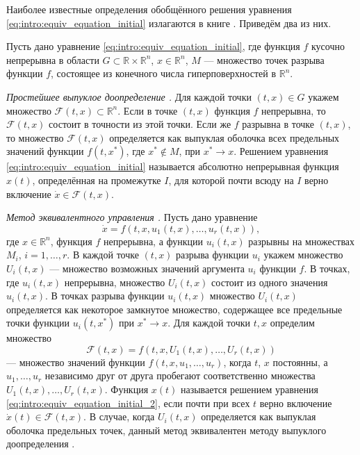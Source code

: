 Наиболее известные определения обобщённого решения уравнения \eqref{eq:intro:equiv_equation_initial} излагаются в книге \cite[\S 4]{Filippov1988}. Приведём два из них.

Пусть дано уравнение \eqref{eq:intro:equiv_equation_initial}, где функция $f$ кусочно непрерывна в области $G \subset \mathbb{R} \times \mathbb{R}^n$, $x \in \mathbb{R}^n$, $M$ --- множество точек разрыва функции $f$, состоящее из конечного числа гиперповерхностей в $\mathbb{R}^n$.

\emph{Простейшее выпуклое доопределение \cite{Filippov1988}.} Для каждой точки $(t, x) \in G$ укажем множество $\mathcal{F}(t, x) \subset \mathbb{R}^n$. Если в точке $(t, x)$ функция $f$ непрерывна, то $\mathcal{F}(t, x)$ состоит в точности из этой точки. Если же $f$ разрывна в точке $(t, x)$, то множество $\mathcal{F}(t, x)$ определяется как выпуклая оболочка всех предельных значений функции $f(t, x^*)$, где $x^* \not\in M$, при $x^* \to x$. Решением уравнения \eqref{eq:intro:equiv_equation_initial} называется абсолютно непрерывная функция $x(t)$, определённая на промежутке $I$, для которой почти всюду на $I$ верно включение $\dot{x} \in \mathcal{F}(t, x)$.

\emph{Метод эквивалентного управления \cite{Utkin1981}.} Пусть дано уравнение 
\begin{equation}
	\label{eq:intro:equiv_equation_initial_2}
	\dot{x} = f(t, x, u_1(t, x), \ldots, u_r(t, x)),
\end{equation}
где $x \in \mathbb{R}^n$, функция $f$ непрерывна, а функции $u_i(t, x)$ разрывны на множествах $M_i$, $i = 1, \ldots, r$. В каждой точке $(t, x)$ разрыва функции $u_i$ укажем множество $U_i(t, x)$ --- множество возможных значений аргумента $u_i$ функции $f$. В точках, где $u_i(t, x)$ непрерывна, множество $U_i(t, x)$ состоит из одного значения $u_i(t, x)$. В точках разрыва функции $u_i(t, x)$ множество $U_i(t, x)$ определяется как некоторое замкнутое множество, содержащее все предельные точки функции $u_i(t, x^*)$ при $x^* \to x$. Для каждой точки $t, x$ определим множество
\[
\mathcal{F}(t, x) = f(t, x, U_1(t, x), \ldots, U_r(t, x))
\]
--- множество значений функции $f(t, x, u_1, \ldots, u_r)$, когда $t$, $x$ постоянны, а $u_1, \ldots, u_r$ независимо друг от друга пробегают соответственно множества $U_1(t, x), \ldots, U_r(t, x)$. Функция $x(t)$ называется решением уравнения \eqref{eq:intro:equiv_equation_initial_2}, если почти при всех $t$ верно включение $\dot{x}(t) \in \mathcal{F}(t, x)$. В случае, когда $U_i(t, x)$ определяется как выпуклая оболочка предельных точек, данный метод эквивалентен методу выпуклого доопределения \cite{Filippov1988}.

